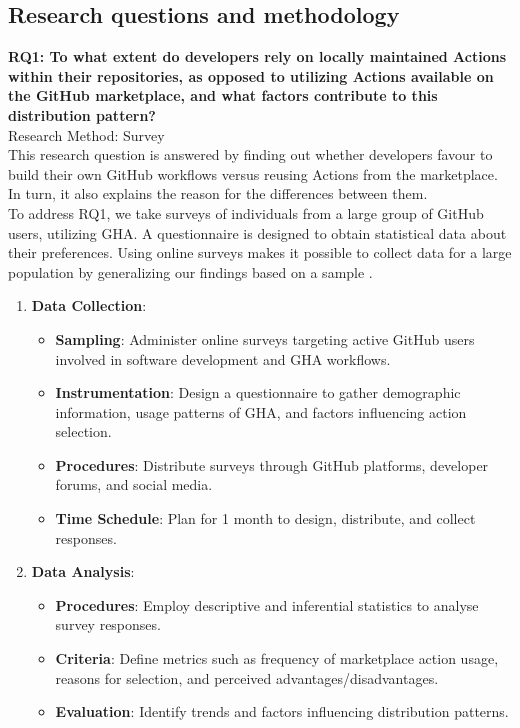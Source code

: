 \documentclass[conference]{IEEEtran}
\begin{document}
\subsection{Research questions and methodology}

\textbf{RQ1: To what extent do developers rely on locally maintained Actions within their repositories, as opposed to utilizing Actions available on the GitHub marketplace, and what factors contribute to this distribution pattern?}\\

Research Method: Survey\\
	
This research question is answered by finding out whether developers favour to build their own GitHub workflows versus reusing Actions from the marketplace. In turn, it also explains the reason for the differences between them.\\

To address RQ1, we take surveys of individuals from a large group of GitHub users, utilizing GHA. A questionnaire is designed to obtain statistical data about their preferences. Using online surveys makes it possible to collect data for a large population by generalizing our findings based on a sample \cite{linaker2013guidelines}.\\

\begin{enumerate}
    \item \textbf{Data Collection}:\\
    \begin{itemize}
        \item \textbf{Sampling}: Administer online surveys targeting active GitHub users involved in software development and GHA workflows.
        \item \textbf{Instrumentation}: Design a questionnaire to gather demographic information, usage patterns of GHA, and factors influencing action selection.
        \item \textbf{Procedures}: Distribute surveys through GitHub platforms, developer forums, and social media.
        \item \textbf{Time Schedule}: Plan for 1 month to design, distribute, and collect responses.\\
    \end{itemize}
    
    \item \textbf{Data Analysis}:\\
    \begin{itemize}
        \item \textbf{Procedures}: Employ descriptive and inferential statistics to analyse survey responses.
        \item \textbf{Criteria}: Define metrics such as frequency of marketplace action usage, reasons for selection, and perceived advantages/disadvantages.
        \item \textbf{Evaluation}: Identify trends and factors influencing distribution patterns.\\
    \end{itemize}
\end{enumerate}
\end{document}
